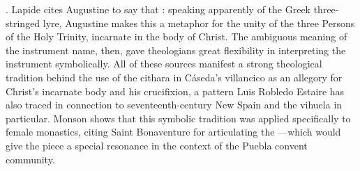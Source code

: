 .%
    \Autocite[370]{Lapide:1Samuel}
Lapide cites Augustine to say that : speaking apparently of the Greek three-stringed lyre, Augustine makes
this a metaphor for the unity of the three Persons of the Holy Trinity,
incarnate in the body of Christ.%
    \Autocite
    [370, citing Augustine, ]
    {Lapide:1Samuel}
The ambiguous meaning of the instrument name, then, gave theologians great
flexibility in interpreting the instrument symbolically.
All of these sources manifest a strong theological tradition behind the use of
the cithara in Cáseda's villancico as an allegory for Christ's incarnate body
and his crucifixion, a pattern Luis Robledo Estaire has also traced in
connection to seventeenth-century New Spain and the vihuela in particular.%
    \Autocite{Robledo:CruzInstrumentos}
Monson shows that this symbolic tradition was applied specifically to female
monastics, citing Saint Bonaventure for articulating the ---which
would give the piece a special resonance in the context of the Puebla convent
community.%
    \Autocites
    [93--94]{Monson:DivasConvent}
    [see also][]{Ocana:AmoresHumanos}


